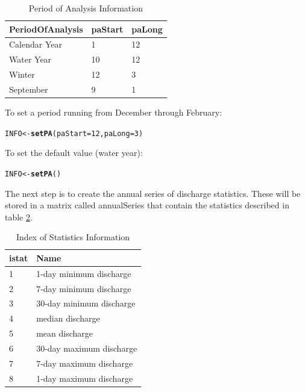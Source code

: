 \documentclass[a4paper,11pt]{article}\usepackage[]{graphicx}\usepackage[]{color}
\makeatletter
\newcommand{\hlnum}[1]{\textcolor[rgb]{0.686,0.059,0.569}{#1}}%
\newcommand{\hlstd}[1]{\textcolor[rgb]{0.345,0.345,0.345}{#1}}%
\newcommand{\hlkwb}[1]{\textcolor[rgb]{0.69,0.353,0.396}{#1}}%
\newcommand{\hlkwc}[1]{\textcolor[rgb]{0.333,0.667,0.333}{#1}}%
\newcommand{\hlkwd}[1]{\textcolor[rgb]{0.737,0.353,0.396}{\textbf{#1}}}%
\newenvironment{kframe}{%
 \def\at@end@of@kframe{}%
 \ifinner\ifhmode%
  \def\at@end@of@kframe{\end{minipage}}%
  \begin{minipage}{\columnwidth}%
 \fi\fi%
 \def\FrameCommand##1{\hskip\@totalleftmargin \hskip-\fboxsep
 \colorbox{shadecolor}{##1}\hskip-\fboxsep
     \hskip-\linewidth \hskip-\@totalleftmargin \hskip\columnwidth}%
 \MakeFramed {\advance\hsize-\width
   \@totalleftmargin\z@ \linewidth\hsize
   \@setminipage}}%
 {\par\unskip\endMakeFramed%
 \at@end@of@kframe}
\newenvironment{knitrout}{}{} %
\makeatother
\begin{document}
\begin{table}[!ht]
\centering
\caption{Period of Analysis Information} 
\label{table:paINFO}
\begin{tabular}{lll}
  \hline
PeriodOfAnalysis & paStart & paLong \\ 
  \hline
Calendar Year & 1 & 12 \\ 
  Water Year & 10 & 12 \\ 
  Winter & 12 & 3 \\ 
  September & 9 & 1 \\ 
   \hline
\end{tabular}
\end{table}

To set a period running from December through February:
\begin{knitrout}
\color{fgcolor}\begin{kframe}
\begin{alltt}
\hlstd{INFO} \hlkwb{<-} \hlkwd{setPA}\hlstd{(}\hlkwc{paStart}\hlstd{=}\hlnum{12}\hlstd{,}\hlkwc{paLong}\hlstd{=}\hlnum{3}\hlstd{)}
\end{alltt}
\end{kframe}
\end{knitrout}


To set the default value (water year):
\begin{knitrout}
\color{fgcolor}\begin{kframe}
\begin{alltt}
\hlstd{INFO} \hlkwb{<-} \hlkwd{setPA}\hlstd{()}
\end{alltt}
\end{kframe}
\end{knitrout}


The next step is to create the annual series of discharge statistics.  These will be stored in a matrix called annualSeries that contain the statistics described in table \ref{table:istat}.

\begin{table}[!ht]
\centering
\caption{Index of Statistics Information} 
\label{table:istat}
\begin{tabular}{ll}
  \hline
istat & Name \\ 
  \hline
1 & 1-day minimum discharge \\ 
  2 & 7-day minimum discharge \\ 
  3 & 30-day minimum discharge \\ 
  4 & median discharge \\ 
  5 & mean discharge \\ 
  6 & 30-day maximum discharge \\ 
  7 & 7-day maximum discharge \\ 
  8 & 1-day maximum discharge \\ 
   \hline
\end{tabular}
\end{table}
\end{document}
